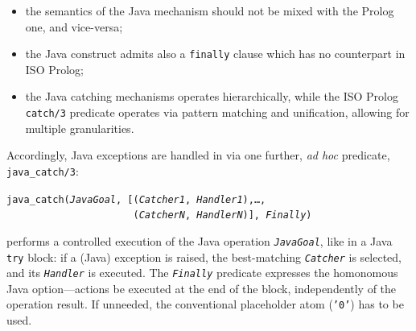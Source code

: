 \begin{itemize}
  \item the semantics of the Java mechanism should not be mixed with the Prolog one, and vice-versa;

  \item the Java construct admits also a \texttt{finally} clause which has no counterpart in ISO Prolog;

  \item the Java catching mechanisms operates hierarchically, while the ISO Prolog \texttt{catch/3} predicate operates via pattern matching and unification, allowing for multiple granularities.
\end{itemize}


\noindent Accordingly, Java exceptions are handled in \tuprolog{} via one further, \textit{ad hoc} predicate, \texttt{java\_catch/3}:



    \noindent \texttt{java\_catch(\textit{JavaGoal}, [(\textit{Catcher1}, \textit{Handler1}),\ldots, \\
    \mbox{~~~~~~~~~~~~~~~~~~~~~~}(\textit{CatcherN}, \textit{HandlerN})], \textit{Finally})}

    \noindent performs a controlled execution of the Java operation \texttt{\textit{JavaGoal}}, like in a Java \texttt{try} block: if a (Java) exception is raised, the best-matching \texttt{\textit{Catcher}} is selected, and its \texttt{\textit{Handler}} is executed.
    The \texttt{\textit{Finally}} predicate expresses the homonomous Java option---actions be executed at the end of the block, independently of the operation result. If unneeded, the conventional placeholder atom (\texttt{'0'}) has to be used.

